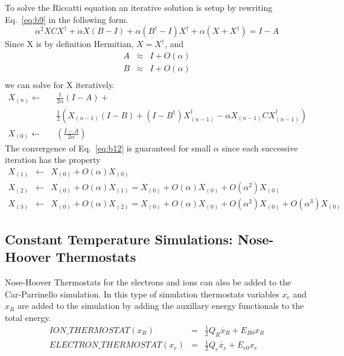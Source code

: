 \noindent
To solve the Riccatti equation an iterative solution is setup by rewriting
Eq.~\ref{eq:b9} in the following form.
\begin{equation}
\alpha^2 XCX^{\dag} + \alpha X(B-I) + \alpha (B^{\dag}-I)X^{\dag} 
 + \alpha(X + X^{\dag}) = I-A
\end{equation}
Since X is by definition Hermitian, $X=X^{\dag}$, and 
\begin{eqnarray}
A  &\approx& I + O(\alpha) \nonumber \\
B  &\approx& I + O(\alpha)  \\
\end{eqnarray}
we can solve for X iteratively.
\begin{eqnarray}
\label{eq:b11}
X_{(n)} \leftarrow && \frac{1}{2 \alpha}(I-A) + \nonumber \\
                   && \frac{1}{2} \left( X_{(n-1)}(I-B)
                    + (I-B^{\dag})X_{(n-1)}^{\dag}
                    - \alpha X_{(n-1)}CX_{(n-1)}^{\dag} \right)  \\
\label{eq:b12}
X_{(0)} \leftarrow && \left(\frac{I-A}{2 \alpha}\right)
\end{eqnarray}
The convergence of Eq.~\ref{eq:b12} is guaranteed for small $\alpha$
since each successive iteration has the property
\begin{eqnarray}
X_{(1)} &\leftarrow& X_{(0)} + O(\alpha)X_{(0)} \nonumber \\
X_{(2)} &\leftarrow& X_{(0)} + O(\alpha) X_{(1)} 
        = X_{(0)} + O(\alpha)X_{(0)} + O(\alpha^2)X_{(0)} \nonumber \\
X_{(3)} &\leftarrow& X_{(0)} + O(\alpha) X_{(2)} 
        = X_{(0)} + O(\alpha)   X_{(0)} 
                  + O(\alpha^2) X_{(0)} 
                  + O(\alpha^3) X_{(0)} \nonumber
\end{eqnarray}

\subsection{Constant Temperature Simulations: Nose-Hoover Thermostats}
\label{sec:pspw_nose}

Nose-Hoover Thermostats for the electrons and ions can also be added to the 
Car-Parrinello simulation.  In this type of simulation thermostats variables $x_e$ and $x_R$ 
are added to the simulation by adding the auxillary energy functionals to the total energy.
\begin{eqnarray}
ION\_THERMOSTAT(x_R)      &=&  \frac{1}{2} Q_R \dot{x_R} + E_{R0}x_R \\ 
ELECTRON\_THERMOSTAT(x_e) &=&  \frac{1}{2} Q_e \dot{x_e} + E_{e0}x_e 
\end{eqnarray}

